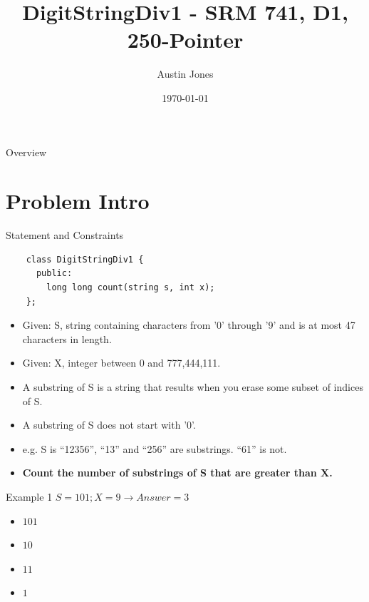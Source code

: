 \documentclass[10pt]{beamer}
\author{Austin Jones}
\title{DigitStringDiv1 \-- SRM 741, D1, 250-Pointer}
\date{\today}
\institute{University of Tennessee \-- Knoxville}
\begin{document}
\maketitle

\begin{frame}{Overview}
  \Large
  \tableofcontents[hideallsubsections]
\end{frame}

\section{Problem Intro}

\begin{frame}[fragile]{Statement and Constraints}
  \begin{verbatim}
    class DigitStringDiv1 {
      public:
        long long count(string s, int x);
    };
  \end{verbatim}
  \begin{itemize}
    \item Given: S, string containing characters from '0' through '9' and is at most 47 characters in length.
    \item Given: X, integer between 0 and 777,444,111.
    \item A substring of S is a string that results when you erase some subset of indices of S.
    \item A substring of S does not start with '0'.
    \item e.g. S is ``12356'', ``13'' and ``256'' are substrings. ``61'' is not.
    \item \textbf{Count the number of substrings of S that are greater than X.}
  \end{itemize}
\end{frame}

\begin{frame}{Example 1}
  \Large
  $S = 101; X = 9 \rightarrow Answer = 3$ \\
  \begin{itemize}[<+->]
    \item $101$ \only<5->{$ > 9$}   \only<6>{Here!}
    \item $10$     
    \item $11$     
    \item $1$   
  \end{itemize}
\end{frame}
\end{document}
